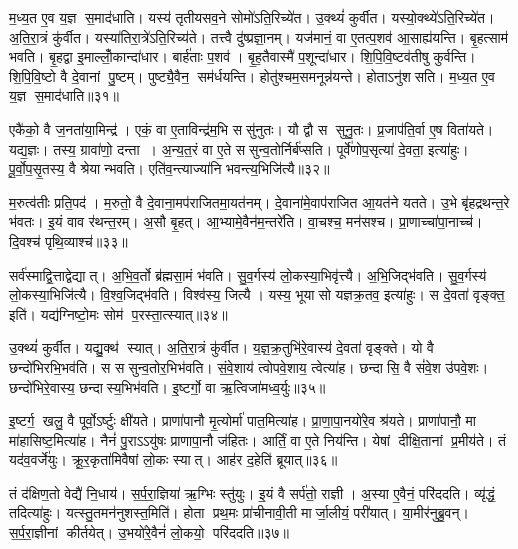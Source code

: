म॒ध्य॒त ए॒व य॒ज्ञ स॒माद॑धाति। यस्य॑ तृतीयसव॒ने सोमो॑ऽति॒रिच्ये॑त। उ॒क्थ्यं॑ कुर्वीत। यस्यो॒क्थ्ये॑ऽति॒रिच्ये॑त। अ॒ति॒रा॒त्रं कु॑र्वीत। यस्या॑तिरा॒त्रे॑ऽति॒रिच्य॑ते। तत्त्वै दु॑ष्प्रज्ञा॒नम्। यज॑मानं॒ वा ए॒तत्प॒शव॑ आ॒साह्य॑यन्ति। बृ॒हत्साम॑ भवति। बृ॒हद्वा इ॒माल्लोँ॒कान्दा॑धार। बार्\mbox{}ह॑ताः प॒शव॑। बृ॒ह॒तैवास्मै॑ प॒शून्दा॑धार। शि॒पि॒वि॒ष्टव॑तीषु कुर्वन्ति। शि॒पि॒वि॒ष्टो वै दे॒वानां पु॒ष्टम्। पुष्ट्यै॒वैन॒ सम॑र्धयन्ति। होतु॑श्चम॒समनून्न॑यन्ते। होताऽनु॑शसति। म॒ध्य॒त ए॒व य॒ज्ञ स॒माद॑धाति॥३१॥\anuvakamend[य॒न्ति॒ सव॑नस्याति॒रिच्य॑ते शसति दाधारा॒ष्टौ च॑]

एकै॑को॒ वै ज॒नता॑या॒मिन्द्र॑। एकं॒ वा ए॒ताविन्द्र॑म॒भि ससु॑नुतः। यौ द्वौ स सुनु॒तः। प्र॒जाप॑ति॒र्वा ए॒ष विता॑यते। यद्य॒ज्ञः। तस्य॒ ग्रावा॑णो॒ दन्ता। अ॒न्य॒त॒रं वा ए॒ते ससुन्व॒तोर्निर्ब॑प्सति। पूर्वे॑णोप॒सृत्या॑ दे॒वता॒ इत्या॑हुः। पू॒र्वो॒प॒सृ॒तस्य॒ वै श्रेयान्भवति। एति॑व॒न्त्याज्या॑नि भवन्त्य॒भिजि॑त्यै॥३२॥

म॒रुत्व॑तीः प्रति॒पद॑। म॒रुतो॒ वै दे॒वाना॒मप॑राजितमा॒यत॑नम्। दे॒वाना॑मे॒वाप॑राजित आ॒यत॑ने यतते। उ॒भे बृ॑हद्रथन्त॒रे भ॑वतः। इ॒यं वाव र॑थन्त॒रम्। अ॒सौ बृ॒हत्। आ॒भ्यामे॒वैन॑म॒न्तरे॑ति। वा॒चश्च॒ मन॑सश्च। प्रा॒णाच्चा॑पा॒नाच्च॑। दि॒वश्च॑ पृथि॒व्याश्च॑॥३३॥

सर्व॑स्माद्वि॒त्ताद्वेद्यात्। अ॒भि॒व॒र्तो ब्र॑ह्मसा॒मं भ॑वति। सु॒व॒र्गस्य॑ लो॒कस्या॒भिवृ॑त्त्यै। अ॒भि॒जिद्भ॑वति। सु॒व॒र्गस्य॑ लो॒कस्या॒भिजि॑त्यै। वि॒श्व॒जिद्भ॑वति। विश्व॑स्य॒ जित्यै। यस्य॒ भूयासो यज्ञक्र॒तव॒ इत्या॑हुः। स दे॒वता॑ वृङ्क्त॒ इति॑। यद्य॑ग्निष्टो॒मः सोम॑ प॒रस्ता॒त्स्यात्॥३४॥

उ॒क्थ्यं॑ कुर्वीत। यद्यु॒क्थ॑ स्यात्। अ॒ति॒रा॒त्रं कु॑र्वीत। य॒ज्ञ॒क्र॒तुभि॑रे॒वास्य॑ दे॒वता॑ वृङ्क्ते। यो वै छन्दो॑भिरभि॒भव॑ति। स ससुन्व॒तोर॒भिभ॑वति। सं॒वे॒शाय॑ त्वोपवे॒शाय॒ त्वेत्या॑ह। छन्दासि॒ वै सं॑वे॒श उ॑पवे॒शः। छन्दो॑भिरे॒वास्य॒ छन्दास्य॒भिभ॑वति। इ॒ष्टर्गो॒ वा ऋ॒त्विजा॑मध्व॒र्युः॥३५॥

इ॒ष्टर्ग॒ खलु॒ वै पूर्वो॒ऽर्ष्टुः क्षी॑यते। प्राणा॑पानौ मृ॒त्योर्मा॑ पात॒मित्या॑ह। प्रा॒णा॒पा॒नयो॑रे॒व श्र॑यते। प्राणा॑पानौ॒ मा मा॑हासिष्ट॒मित्या॑ह। नैनं॑ पु॒राऽऽयु॑षः प्राणापा॒नौ ज॑हितः। आर्तिं॒ वा ए॒ते निय॑न्ति। येषां दीक्षि॒तानां प्र॒मीय॑ते। तं यद॑व॒वर्जे॑युः। क्रू॒र॒कृता॑मिवैषां लो॒कः स्यात्। आह॑र द॒हेति॑ ब्रूयात्॥३६॥

तं द॑क्षिण॒तो वेद्यै॑ नि॒धाय॑। स॒र्प॒रा॒ज्ञिया॑ ऋ॒ग्भिः स्तु॑युः। इ॒यं वै सर्प॑तो॒ राज्ञी। अ॒स्या ए॒वैनं॒ परि॑ददति। व्यृ॑द्धं॒ तदित्या॑हुः। यत्स्तु॒तमन॑नुशस्त॒मिति॑। होता प्रथ॒मः प्रा॑चीनावी॒ती मार्जा॒लीयं॒ परी॑यात्। या॒मीर॑नुब्रु॒वन्। स॒र्प॒रा॒ज्ञीनां कीर्तयेत्। उ॒भयो॑रे॒वैनं॑ लो॒कयो॒ परि॑ददति॥३७॥

